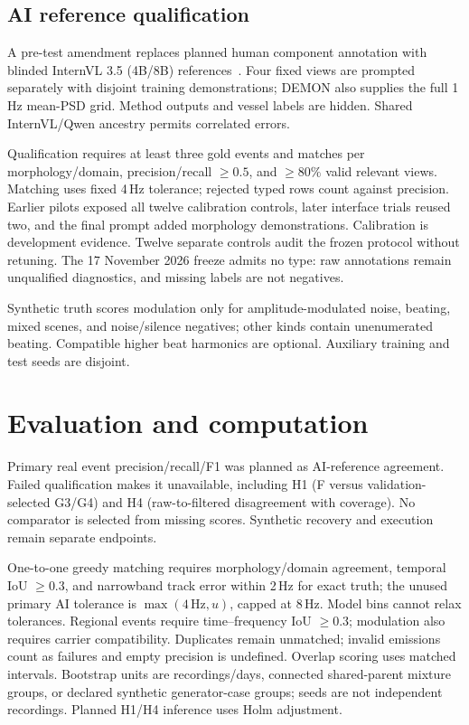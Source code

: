 \documentclass[runningheads,orivec]{llncs}
\begin{document}
\subsection{AI reference qualification}\label{sec:references}
A pre-test amendment replaces planned human component annotation with blinded InternVL 3.5 (4B/8B) references~\cite{wang2025internvl35}. Four fixed views are prompted separately with disjoint training demonstrations; DEMON also supplies the full 1\,Hz mean-PSD grid. Method outputs and vessel labels are hidden. Shared InternVL/Qwen ancestry permits correlated errors.

Qualification requires at least three gold events and matches per morphology/domain, precision/recall $\geq0.5$, and $\geq80\%$ valid relevant views. Matching uses fixed 4\,Hz tolerance; rejected typed rows count against precision. Earlier pilots exposed all twelve calibration controls, later interface trials reused two, and the final prompt added morphology demonstrations. Calibration is development evidence. Twelve separate controls audit the frozen protocol without retuning. The 17 November 2026 freeze admits no type: raw annotations remain unqualified diagnostics, and missing labels are not negatives.

Synthetic truth scores modulation only for amplitude-modulated noise, beating, mixed scenes, and noise/silence negatives; other kinds contain unenumerated beating. Compatible higher beat harmonics are optional. Auxiliary training and test seeds are disjoint.

\section{Evaluation and computation}
Primary real event precision/recall/F1 was planned as AI-reference agreement. Failed qualification makes it unavailable, including H1 (F versus validation-selected G3/G4) and H4 (raw-to-filtered disagreement with coverage). No comparator is selected from missing scores. Synthetic recovery and execution remain separate endpoints.

One-to-one greedy matching requires morphology/domain agreement, temporal IoU $\geq0.3$, and narrowband track error within 2\,Hz for exact truth; the unused primary AI tolerance is $\max(4\,\mathrm{Hz},u)$, capped at 8\,Hz. Model bins cannot relax tolerances. Regional events require time--frequency IoU $\geq0.3$; modulation also requires carrier compatibility. Duplicates remain unmatched; invalid emissions count as failures and empty precision is undefined. Overlap scoring uses matched intervals. Bootstrap units are recordings/days, connected shared-parent mixture groups, or declared synthetic generator-case groups; seeds are not independent recordings. Planned H1/H4 inference uses Holm adjustment.
\end{document}
